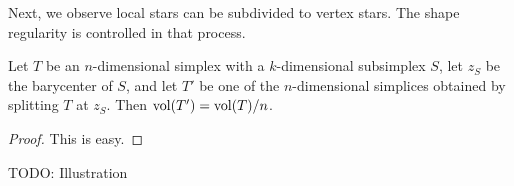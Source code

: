\documentclass[10pt,a4paper]{article}
\newcommand{\mwl}[1]{{\color{red}#1}}
\begin{document}



Next, we observe local stars can be subdivided to vertex stars.
The shape regularity is controlled in that process. 

\begin{lemma}\label{lemma:stardivision}
    Let $T$ be an $n$-dimensional simplex with a $k$-dimensional subsimplex $S$,
    let $z_S$ be the barycenter of $S$, 
    and let $T'$ be one of the $n$-dimensional simplices obtained by splitting $T$ at $z_{S}$.
    Then $\operatorname{vol}(T') = \operatorname{vol}(T) / n$. 
\end{lemma}
\begin{proof}
    This is easy.
\end{proof}

\mwl{TODO: Illustration}
\end{document}
